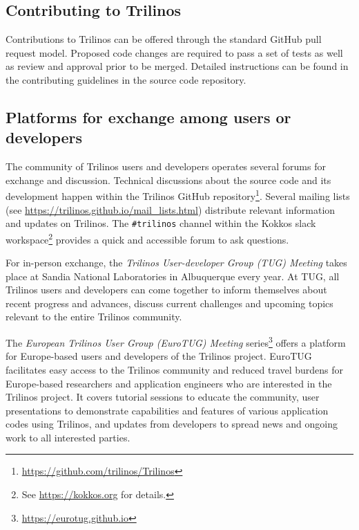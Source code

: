 
\subsection{Contributing to Trilinos}

Contributions to Trilinos can be offered through the standard GitHub pull request model.
Proposed code changes are required to pass a set of tests as well as review and approval prior to be merged.
Detailed instructions can be found in the contributing guidelines in the source code repository.

\subsection{Platforms for exchange among users or developers}

The community of Trilinos users and developers operates several forums for exchange and discussion.
Technical discussions about the source code and its development happen within the Trilinos GitHub repository\footnote{\url{https://github.com/trilinos/Trilinos}}.
Several mailing lists (see \url{https://trilinos.github.io/mail_lists.html}) distribute relevant information and updates on Trilinos.
The \texttt{\#trilinos} channel within the Kokkos slack workspace\footnote{See \url{https://kokkos.org} for details.} provides a quick and accessible forum to ask questions.

For in-person exchange, the \emph{Trilinos User-developer Group (TUG) Meeting} takes place at Sandia National Laboratories in Albuquerque every year.
At TUG, all Trilinos users and developers can come together to inform themselves about recent progress and advances,
discuss current challenges and upcoming topics relevant to the entire Trilinos community.

The \emph{European Trilinos User Group (EuroTUG) Meeting} series\footnote{\url{https://eurotug.github.io}}
offers a platform for Europe-based users and developers of the Trilinos project.
EuroTUG facilitates easy access to the Trilinos community and reduced travel burdens for Europe-based researchers and application engineers
who are interested in the Trilinos project.
It covers tutorial sessions to educate the community,
user presentations to demonstrate capabilities and features of various application codes using Trilinos,
and updates from developers to spread news and ongoing work to all interested parties.
